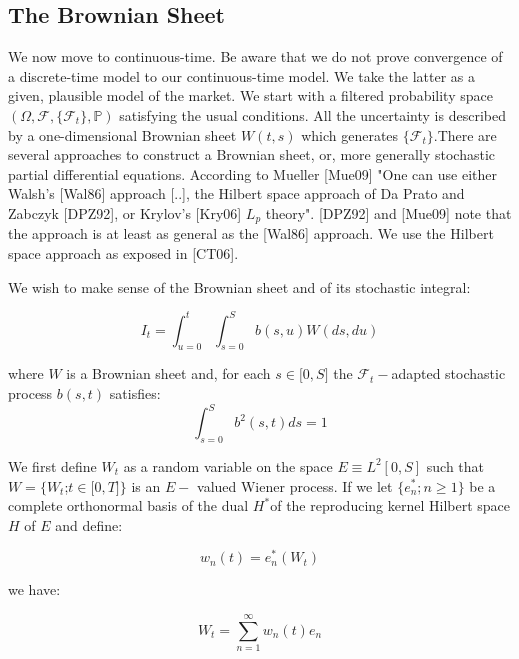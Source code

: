 \documentclass{article}
\begin{document}
\subsection{The Brownian Sheet}

We now move to continuous-time. Be aware that we do not prove convergence of
a discrete-time model to our continuous-time model. We take the latter as a
given, plausible model of the market. We start with a filtered probability
space $(\Omega ,\mathcal{F},\{\mathcal{F}_{t}\},\mathbb{P})$ satisfying the
usual conditions. All the uncertainty is described by a one-dimensional
Brownian sheet $W(t,s)$ which generates $\{\mathcal{F}_{t}\}$.There are
several approaches to construct a Brownian sheet, or, more generally
stochastic partial differential equations. According to Mueller [Mue09] "One
can use either Walsh's [Wal86] approach [..], the Hilbert space approach of
Da Prato and Zabczyk [DPZ92], or Krylov's [Kry06] $L_{p}$ theory". [DPZ92]
and [Mue09] note that the approach is at least as general as the [Wal86]
approach. We use the Hilbert space approach as exposed in [CT06].

\bigskip

We wish to make sense of the Brownian sheet and of its stochastic integral:

\begin{equation}
I_{t}=\int_{u=0}^{t}\int_{s=0}^{S}b(s,u)W(ds,du)  \label{continuous}
\end{equation}%
\bigskip

where $W$ is a Brownian sheet and, for each $s\in \lbrack 0,S]$ the $%
\mathcal{F}_{t}-$adapted stochastic process $b(s,t)$ satisfies:%
\begin{equation*}
\int_{s=0}^{S}b^{2}(s,t)ds=1
\end{equation*}

We first define $W_{t}$ as a random variable on the space $E\equiv
L^{2}[0,S] $ such that $W=\{W_{t}$;$t\in \lbrack 0,T]\}$ is an $E-$ valued
Wiener process. If we let $\{e_{n}^{\ast };n\geq 1\}$ be a complete
orthonormal basis of the dual $H^{\ast }$of the reproducing kernel Hilbert
space $H$ of $E$ and define:

\begin{equation*}
w_{n}(t)=e_{n}^{\ast }(W_{t})
\end{equation*}

we have:

\begin{equation}
W_{t}=\sum_{n=1}^{\infty }w_{n}(t)e_{n}  \label{nonconvergent}
\end{equation}
\end{document}
